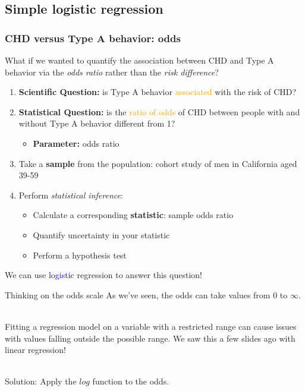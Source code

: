 \documentclass[10pt,t]{beamer}
\begin{document}
\subsection{Simple logistic regression}
\begin{frame}
	\frametitle{CHD versus Type A behavior: odds}
	\vspace{-0.5cm}
	\begin{small} What if we wanted to quantify the association between CHD and Type A behavior via the \textit{odds ratio} rather than the \textit{risk difference}? \end{small} \pause \vspace{0.1cm}

	\begin{enumerate}
			\item \textbf{Scientific Question:} is Type A behavior \textcolor{orange}{associated} with the risk of CHD? \pause
			\item \textbf{Statistical Question:} is the \textcolor{orange}{ratio of odds} of CHD between people with and without Type A behavior different from 1? \pause
			\begin{itemize}
					\item \textbf{Parameter:} odds ratio \pause
				\end{itemize}
			\item Take a \textbf{sample} from the population: cohort study of men in California aged 39-59 \pause
			\item Perform \textit{statistical inference}:
			\begin{itemize}
					\item Calculate a corresponding \textbf{statistic}: sample odds ratio
					\item Quantify uncertainty in your statistic
					\item Perform a hypothesis test \pause
				\end{itemize}
		\end{enumerate}
	
	\vspace{0.1cm}
	We can use \textcolor{blue}{logistic} regression to answer this question!
\end{frame}

\begin{frame}{Thinking on the odds scale}
	As we've seen, the odds can take values from 0 to $\infty$. 
	\\ ~\
	
	Fitting a regression model on a variable with a restricted range can cause issues with values falling outside the possible range. We saw this a few slides ago with linear regression!
	\\ ~\
	
	Solution: Apply the $log$ function to the odds. 
\end{frame}
\end{document}
